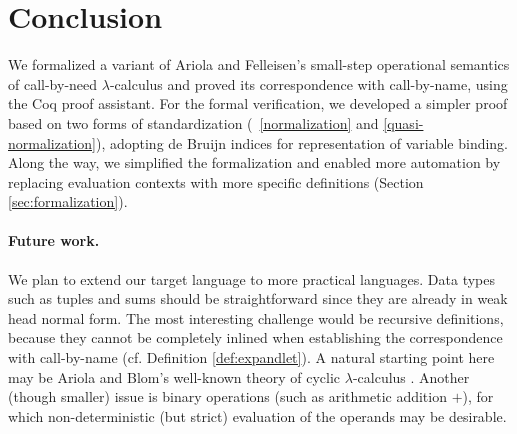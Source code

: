 \documentclass{llncs}
\begin{document}
\section{Conclusion}\label{sec:conclusion}
%
We formalized a variant of Ariola and Felleisen's small-step operational semantics of call-by-need $\lambda$-calculus and proved its correspondence with call-by-name, using the Coq proof assistant.
For the formal verification,
we developed a simpler proof based on two forms of standardization (\lemmaname~\ref{normalization} and \ref{quasi-normalization}),
adopting de Bruijn indices for representation of variable binding.
Along the way, we simplified the formalization and enabled more automation by replacing evaluation contexts with more specific definitions (Section \ref{sec:formalization}).

\paragraph{Future work.}
%
We plan to extend our target language to more practical languages.
Data types such as tuples and sums should be straightforward since they are already in weak head normal form.
The most interesting challenge would be recursive definitions, because they cannot be completely inlined when establishing the correspondence with call-by-name (cf. Definition \ref{def:expandlet}).
A natural starting point here may be Ariola and Blom's well-known theory of cyclic $\lambda$-calculus \cite{Ariola:1997}.
Another (though smaller) issue is binary operations (such as arithmetic addition $+$), for which non-deterministic (but strict) evaluation of the operands may be desirable.
%


%
\end{document}
